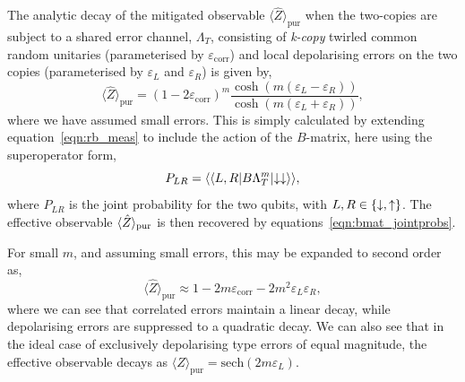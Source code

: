 The analytic decay of the mitigated observable $\langle \hat Z\rangle_\mathrm{pur}$ when the two-copies are subject to a shared error channel, $\Lambda_T$, consisting of \emph{k-copy} twirled common random unitaries (parameterised by $\varepsilon_\mathrm{corr}$) and local depolarising errors on the two copies (parameterised by $\varepsilon_L$ and $\varepsilon_R$) is given by,
\begin{equation}
\label{eqn:vd_correlated}
\langle \hat Z\rangle_\mathrm{pur} = (1-2\varepsilon_\mathrm{corr})^m\frac{\cosh\left(m\left(\varepsilon_L-\varepsilon_R\right)\right)}{\cosh\left(m\left(\varepsilon_L+\varepsilon_R\right)\right)},
\end{equation}
where we have assumed small errors.
This is simply calculated by extending equation~\ref{eqn:rb_meas} to include the action of the $B$-matrix, here using the superoperator form,
\begin{equation}
    P_{LR}=\langle\langle L,R|B\Lambda_T^m\lvert\downarrow\downarrow\rangle\rangle,
\end{equation}
where $P_{LR}$ is the joint probability for the two qubits, with $L,R\in\{\downarrow,\uparrow\}$. The effective observable $\langle \hat Z \rangle_{\rm pur}$ is then recovered by equations~\ref{eqn:bmat_jointprobs}. 

For small $m$, and assuming small errors, this may be expanded to second order as,
\begin{equation}
\label{eqn:vd_corr_decay}
\langle \hat Z\rangle_\mathrm{pur} \approx 1-2m\varepsilon_\mathrm{corr} - 2m^2\varepsilon_L\varepsilon_R,
\end{equation}
where we can see that correlated errors maintain a linear decay, while depolarising errors are suppressed to a quadratic decay. We can also see that in the ideal case of exclusively depolarising type errors of equal magnitude, the effective observable decays as $\langle\hat Z\rangle_\mathrm{pur} = \mathrm{sech}(2m\varepsilon_L)$.

